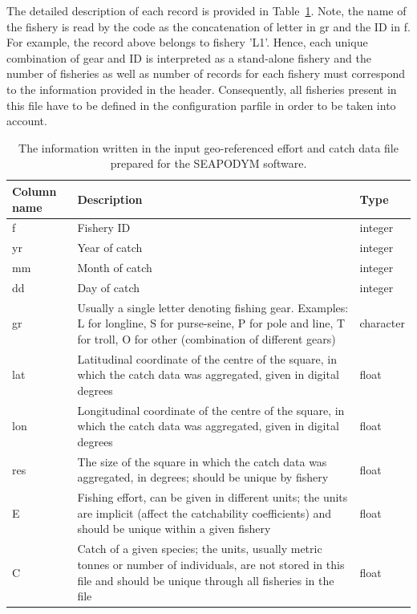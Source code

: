 The detailed description of each record is provided in Table~\ref{tab:EC-fformat}.  Note, the name of the fishery is read by the code as the concatenation of letter in {\ttfamily gr} and the ID in {\ttfamily f}. For example, the record above belongs to fishery 'L1'. Hence, each unique combination of gear and ID is interpreted as a stand-alone fishery and the number of fisheries as well as number of records for each fishery must correspond to the information provided in the header. Consequently, all fisheries present in this file have to be defined in the configuration parfile in order to be taken into account.   

\vspace*{2cm}
\begin{table}
\caption{The information written in the input geo-referenced effort and catch data file prepared for the SEAPODYM software.}
  \vspace{0.25cm}
\begin{tabular}{p{1.65cm}p{12.0cm}p{1.75cm}}
    \hline
   {\bfseries Column name} & {\bfseries Description} & {\bfseries Type}\\ \hline\hline
   {\ttfamily f} & Fishery ID & integer\\  \hline
   {\ttfamily yr} & Year of catch & integer\\ \hline
   {\ttfamily mm} & Month of catch & integer\\ \hline
   {\ttfamily dd} & Day of catch  & integer\\ \hline
   {\ttfamily gr} & Usually a single letter denoting fishing gear. Examples: L for longline, S for purse-seine, P for pole and line, T for troll, O for other (combination of different gears) & character\\ \hline
   {\ttfamily lat} & Latitudinal coordinate of the centre of the square, in which the catch data was aggregated, given in digital degrees & float\\ \hline
   {\ttfamily lon} & Longitudinal coordinate of the centre of the square, in which the catch data was aggregated, given in digital degrees & float\\ \hline
   {\ttfamily res} & The size of the square in which the catch data was aggregated, in degrees; should be unique by fishery & float \\ \hline
    {\ttfamily E} & Fishing effort, can be given in different units; the units are implicit (affect the catchability coefficients) and should be unique within a given fishery & float   \\ \hline
    {\ttfamily C} & Catch of a given species; the units, usually metric tonnes or number of individuals, are not stored in this file and should be unique through all fisheries in the file & float\\ \hline
\end{tabular}
\label{tab:EC-fformat}
\end{table}

